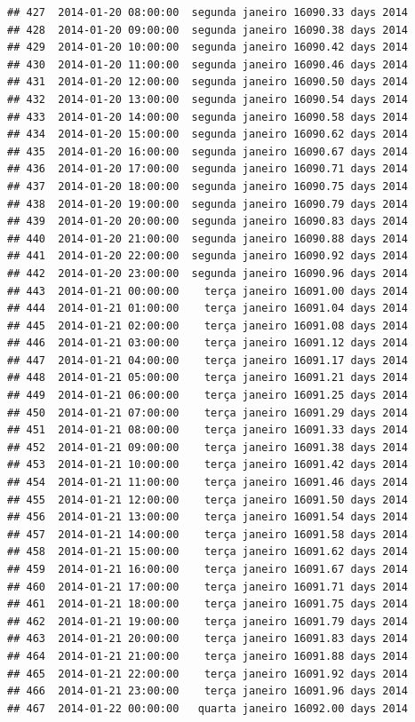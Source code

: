 \documentclass[]{book}
\begin{document}
\begin{verbatim}
## 427  2014-01-20 08:00:00  segunda janeiro 16090.33 days 2014
## 428  2014-01-20 09:00:00  segunda janeiro 16090.38 days 2014
## 429  2014-01-20 10:00:00  segunda janeiro 16090.42 days 2014
## 430  2014-01-20 11:00:00  segunda janeiro 16090.46 days 2014
## 431  2014-01-20 12:00:00  segunda janeiro 16090.50 days 2014
## 432  2014-01-20 13:00:00  segunda janeiro 16090.54 days 2014
## 433  2014-01-20 14:00:00  segunda janeiro 16090.58 days 2014
## 434  2014-01-20 15:00:00  segunda janeiro 16090.62 days 2014
## 435  2014-01-20 16:00:00  segunda janeiro 16090.67 days 2014
## 436  2014-01-20 17:00:00  segunda janeiro 16090.71 days 2014
## 437  2014-01-20 18:00:00  segunda janeiro 16090.75 days 2014
## 438  2014-01-20 19:00:00  segunda janeiro 16090.79 days 2014
## 439  2014-01-20 20:00:00  segunda janeiro 16090.83 days 2014
## 440  2014-01-20 21:00:00  segunda janeiro 16090.88 days 2014
## 441  2014-01-20 22:00:00  segunda janeiro 16090.92 days 2014
## 442  2014-01-20 23:00:00  segunda janeiro 16090.96 days 2014
## 443  2014-01-21 00:00:00    terça janeiro 16091.00 days 2014
## 444  2014-01-21 01:00:00    terça janeiro 16091.04 days 2014
## 445  2014-01-21 02:00:00    terça janeiro 16091.08 days 2014
## 446  2014-01-21 03:00:00    terça janeiro 16091.12 days 2014
## 447  2014-01-21 04:00:00    terça janeiro 16091.17 days 2014
## 448  2014-01-21 05:00:00    terça janeiro 16091.21 days 2014
## 449  2014-01-21 06:00:00    terça janeiro 16091.25 days 2014
## 450  2014-01-21 07:00:00    terça janeiro 16091.29 days 2014
## 451  2014-01-21 08:00:00    terça janeiro 16091.33 days 2014
## 452  2014-01-21 09:00:00    terça janeiro 16091.38 days 2014
## 453  2014-01-21 10:00:00    terça janeiro 16091.42 days 2014
## 454  2014-01-21 11:00:00    terça janeiro 16091.46 days 2014
## 455  2014-01-21 12:00:00    terça janeiro 16091.50 days 2014
## 456  2014-01-21 13:00:00    terça janeiro 16091.54 days 2014
## 457  2014-01-21 14:00:00    terça janeiro 16091.58 days 2014
## 458  2014-01-21 15:00:00    terça janeiro 16091.62 days 2014
## 459  2014-01-21 16:00:00    terça janeiro 16091.67 days 2014
## 460  2014-01-21 17:00:00    terça janeiro 16091.71 days 2014
## 461  2014-01-21 18:00:00    terça janeiro 16091.75 days 2014
## 462  2014-01-21 19:00:00    terça janeiro 16091.79 days 2014
## 463  2014-01-21 20:00:00    terça janeiro 16091.83 days 2014
## 464  2014-01-21 21:00:00    terça janeiro 16091.88 days 2014
## 465  2014-01-21 22:00:00    terça janeiro 16091.92 days 2014
## 466  2014-01-21 23:00:00    terça janeiro 16091.96 days 2014
## 467  2014-01-22 00:00:00   quarta janeiro 16092.00 days 2014

\end{verbatim}
\end{document}
